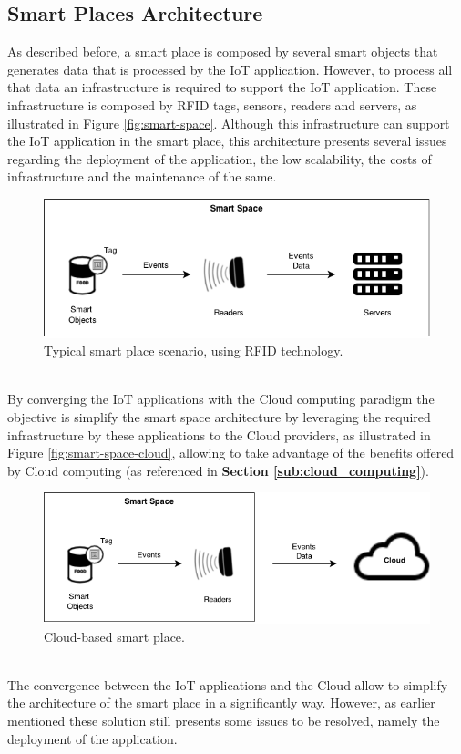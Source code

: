 \subsection{Smart Places Architecture}
\label{sub:smart_places_architecture}
As described before, a smart place is composed by several smart objects that generates
data that is processed by the IoT application. However, to process all that data an
infrastructure is required to support the IoT application. These infrastructure is composed
by RFID tags, sensors, readers and servers, as illustrated in Figure \ref{fig:smart-space}.
Although this infrastructure can support the IoT application in the smart place, this
architecture presents several issues regarding the deployment of the application, the low scalability,
the costs of infrastructure and the maintenance of the same.
\begin{figure}[h!]
  \centering
  \includegraphics[width=\textwidth]{./images/smart-space}
  \caption{Typical smart place scenario, using RFID technology.}
  \label{fig:smart-place}
\end{figure}\\
By converging the IoT applications with the Cloud computing paradigm the objective is simplify the
smart space architecture by leveraging the required infrastructure by these applications to
the Cloud providers, as illustrated in Figure \ref{fig:smart-space-cloud}, allowing to take
advantage of the benefits offered by Cloud computing (as referenced in \textbf{Section \ref{sub:cloud_computing}}).
\begin{figure}
  \centering
  \includegraphics[width=\textwidth]{./images/smart-space-cloud}
  \caption{Cloud-based smart place.}
  \label{fig:smart-place-cloud}
\end{figure}\\
The convergence between the IoT applications and the Cloud allow to simplify the
architecture of the smart place in a significantly way. However, as earlier mentioned
these solution still presents some issues to be resolved, namely the deployment of
the application.
